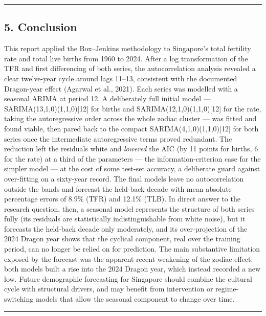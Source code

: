 \documentclass[
  11pt,
]{article}
\begin{document}
\begin{center}\rule{0.5\linewidth}{0.5pt}\end{center}

\subsection{5. Conclusion}\label{conclusion}

This report applied the Box--Jenkins methodology to Singapore's total
fertility rate and total live births from 1960 to 2024. After a log
transformation of the TFR and first differencing of both series, the
autocorrelation analysis revealed a clear twelve-year cycle around lags
11--13, consistent with the documented Dragon-year effect (Agarwal et
al., 2021). Each series was modelled with a seasonal ARIMA at period 12.
A deliberately full initial model --- SARIMA(13,1,0)(1,1,0){[}12{]} for
births and SARIMA(12,1,0)(1,1,0){[}12{]} for the rate, taking the
autoregressive order across the whole zodiac cluster --- was fitted and
found viable, then pared back to the compact
SARIMA(4,1,0)(1,1,0){[}12{]} for both series once the intermediate
autoregressive terms proved redundant. The reduction left the residuals
white and \emph{lowered} the AIC (by 11 points for births, 6 for the
rate) at a third of the parameters --- the information-criterion case
for the simpler model --- at the cost of some test-set accuracy, a
deliberate guard against over-fitting on a sixty-year record. The final
models leave no autocorrelation outside the bands and forecast the
held-back decade with mean absolute percentage errors of 8.9\% (TFR) and
12.1\% (TLB). In direct answer to the research question, then, a
seasonal model represents the structure of both series fully (its
residuals are statistically indistinguishable from white noise), but it
forecasts the held-back decade only moderately, and its over-projection
of the 2024 Dragon year shows that the cyclical component, real over the
training period, can no longer be relied on for prediction. The main
substantive limitation exposed by the forecast was the apparent recent
weakening of the zodiac effect: both models built a rise into the 2024
Dragon year, which instead recorded a new low. Future demographic
forecasting for Singapore should combine the cultural cycle with
structural drivers, and may benefit from intervention or
regime-switching models that allow the seasonal component to change over
time.

\begin{center}\rule{0.5\linewidth}{0.5pt}\end{center}
\end{document}
